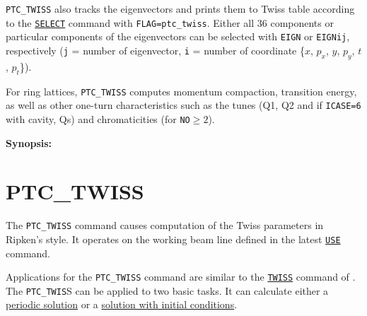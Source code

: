 \texttt{PTC\_TWISS} also tracks the eigenvectors and prints them to Twiss table
according to the \hyperref[sec:select]{\texttt{SELECT}} command  with
\texttt{FLAG=ptc\_twiss}.  
Either all 36 components or particular components of the eigenvectors
can be selected with \texttt{EIGN} or \texttt{EIGNij}, respectively
(\texttt{j} = number of eigenvector, \texttt{i} = number of coordinate
\{$x$, $p_x$, $y$, $p_y$, $t$, $p_t$\}). 

For ring lattices, \texttt{PTC\_TWISS} computes momentum compaction, transition
energy, as well as other one-turn characteristics such as the tunes
(Q1, Q2 and if \texttt{ICASE=6} with cavity, Qs) and chromaticities (for
\texttt{NO}$\geq 2$).  

\textbf{Synopsis:}

\section{PTC\_TWISS}
\label{sec:ptc-twiss}
 
The \texttt{PTC\_TWISS} command causes computation of the Twiss
parameters in Ripken's style. It operates on the working beam line
defined in the latest \hyperref[sec:use]{\texttt{USE}} command. 

Applications for the \texttt{PTC\_TWISS} command are similar to the
\hyperref[chap:twiss]{\texttt{TWISS}} command of \madx. 
The \texttt{PTC\_TWIS}S can be applied to two basic tasks. It can calculate either a
\hyperref[sec:ptc-twiss-periodic]{periodic solution} or a
\hyperref[sec:ptc-twiss-sol-initial-cond]{solution with initial conditions}. 


